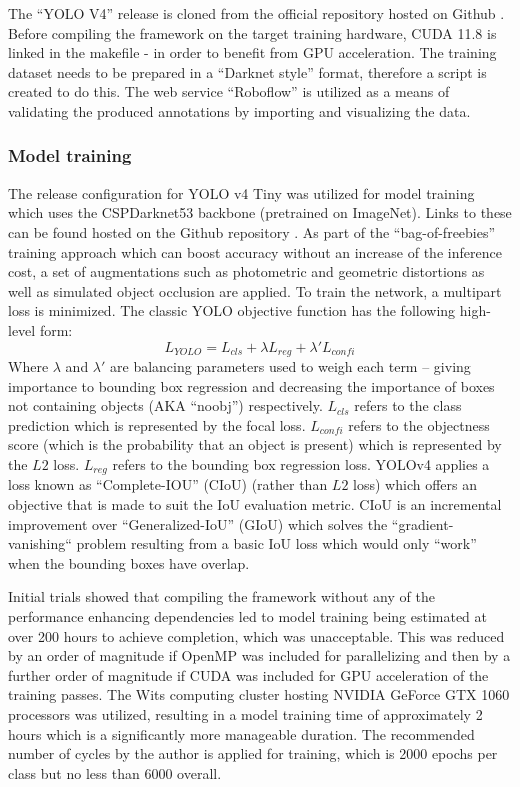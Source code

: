 \documentclass[a4paper,twoside,12pt]{report}
\begin{document}
 The ``YOLO V4'' release is cloned from the official repository hosted on Github \citep{yolov4repo}. Before compiling the framework on the target training hardware, CUDA 11.8 is linked in the makefile - in order to benefit from GPU acceleration. The training dataset needs to be prepared in a ``Darknet style'' format, therefore a script is created to do this. The web service ``Roboflow'' \citep{roboflow} is utilized as a means of validating the produced annotations by importing and visualizing the data. 

\subsubsection{Model training}

The release configuration for YOLO v4 Tiny was utilized for model training which uses the CSPDarknet53 backbone (pretrained on ImageNet). Links to these can be found hosted on the Github repository \citep{yolov4repo}. As part of the ``bag-of-freebies'' training approach which can boost accuracy without an increase of the inference cost, a set of augmentations such as photometric and geometric distortions as well as simulated object occlusion are applied. To train the network, a multipart loss is minimized. The classic YOLO objective function has the following high-level form:
\begin{equation}
L_{YOLO} =  L_{cls} + \lambda L_{reg} + \lambda' L_{confi} 
\end{equation} 
Where $\lambda$ and $\lambda'$ are balancing parameters used to weigh each term -- giving importance to bounding box regression and decreasing the importance of boxes not containing objects (AKA ``noobj'') respectively. $L_{cls} $ refers to the class prediction which is represented by the focal loss. $L_{confi}$ refers to the objectness score (which is the probability that an object is present) which is represented by the $L2$ loss. $L_{reg} $ refers to the bounding box regression loss. YOLOv4 applies a loss known as ``Complete-IOU'' (CIoU) \citep{diouloss} (rather than $L2$ loss) which offers an objective that is made to suit the IoU evaluation metric. CIoU is an incremental improvement over ``Generalized-IoU'' (GIoU) \citep{giouloss} which solves the ``gradient-vanishing`` problem resulting from a basic IoU loss which would only ``work'' when the bounding boxes have overlap. 

Initial trials showed that compiling the framework without any of the performance enhancing dependencies led to model training being estimated at over 200 hours to achieve completion, which was unacceptable. This was reduced by an order of magnitude if OpenMP was included for parallelizing and then by a further order of magnitude if CUDA was included for GPU acceleration of the training passes. The Wits computing cluster hosting NVIDIA GeForce GTX 1060 processors was utilized, resulting in a model training time of approximately 2 hours which is a significantly more manageable duration. The recommended number of cycles by the author is applied for training, which is 2000 epochs per class but no less than 6000 overall.
\end{document}
